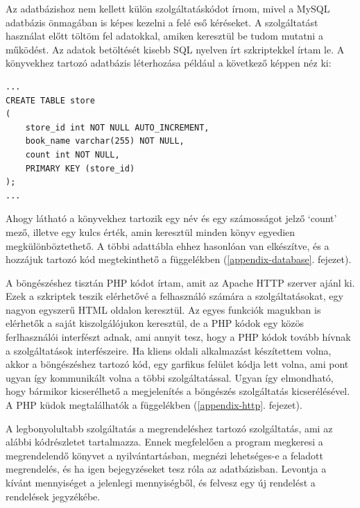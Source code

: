 \documentclass[11pt,magyar,a4paper,twoside,]{report}
\begin{document}
Az adatbázishoz nem kellett külön szolgáltatáskódot írnom, mivel a MySQL
adatbázis önmagában is képes kezelni a felé eső kéréseket. A
szolgáltatást használat előtt töltöm fel adatokkal, amiken keresztül be
tudom mutatni a működést. Az adatok betöltését kisebb SQL nyelven írt
szkriptekkel írtam le. A könyvekhez tartozó adatbázis léterhozása
például a következő képpen néz ki:

\begin{verbatim}
...
CREATE TABLE store
(
    store_id int NOT NULL AUTO_INCREMENT,
    book_name varchar(255) NOT NULL,
    count int NOT NULL,
    PRIMARY KEY (store_id)
);
...
\end{verbatim}

Ahogy látható a könyvekhez tartozik egy név és egy számosságot jelző
`count' mező, illetve egy kulcs érték, amin keresztül minden könyv
egyedien megkülönböztethető. A többi adattábla ehhez hasonlóan van
elkészítve, és a hozzájuk tartozó kód megtekinthető a függelékben
(\ref{appendix-database}. fejezet).

A böngészéshez tisztán PHP kódot írtam, amit az Apache HTTP szerver
ajánl ki. Ezek a szkriptek teszik elérhetővé a felhasználó számára a
szolgáltatásokat, egy nagyon egyszerű HTML oldalon keresztül. Az egyes
funkciók magukban is elérhetők a saját kiszolgálójukon keresztül, de a
PHP kódok egy közös ferlhasználói interfészt adnak, ami annyit tesz,
hogy a PHP kódok tovább hívnak a szolgáltatások interfészeire. Ha kliens
oldali alkalmazást készítettem volna, akkor a böngészéshez tartozó kód,
egy garfikus felület kódja lett volna, ami pont ugyan így kommunikált
volna a többi szolgáltatással. Ugyan így elmondható, hogy bármikor
kicserélhető a megjelenítés a böngészés szolgáltatás kicserélésével. A
PHP küdok megtalálhatók a függelékben (\ref{appendix-http}. fejezet).

A legbonyolultabb szolgáltatás a megrendeléshez tartozó szolgáltatás,
ami az alábbi kódrészletet tartalmazza. Ennek megfelelően a program
megkeresi a megrendelendő könyvet a nyilvántartásban, megnézi
lehetséges-e a feladott megrendelés, és ha igen bejegyzéseket tesz róla
az adatbázisban. Levontja a kívánt mennyiséget a jelenlegi mennyiségből,
és felvesz egy új rendelést a rendelések jegyzékébe.
\end{document}
